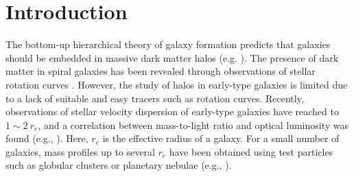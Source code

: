 \documentclass[structabstract]{aa}
\begin{document}

   \maketitle

\section{Introduction}

The bottom-up hierarchical theory of galaxy formation
predicts that galaxies should be embedded in massive dark matter halos 
(e.g. \citealt{Nava1997}). The presence of dark matter in spiral
galaxies has been revealed through observations of stellar rotation
curves \citep{Rubin1978,vanA1985}. However, the study
of halos in early-type galaxies is limited due to a lack of suitable
and easy tracers such as rotation curves. Recently, observations of
stellar velocity dispersion of early-type galaxies have reached to
$1\sim2~ r_e$, and a correlation between mass-to-light ratio and optical
luminosity was found (e.g., \citealt{Kron2000,Gerh2001}). Here, $r_e$ is
the effective radius of a galaxy. For a small
number of galaxies, mass profiles up to several $r_e$ have been obtained
using test particles such as globular clusters or planetary nebulae
(e.g., \citealt{Roma2003,Chak2008}). 
\end{document}
